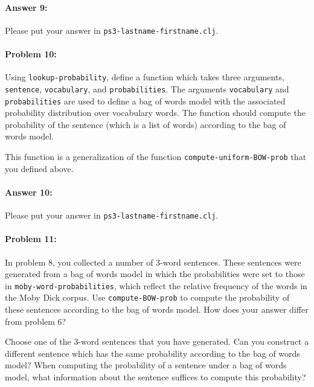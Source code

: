 \documentclass[10pt]{article}
\newcommand{\required}[1]{{\color{blue}{#1}}}
\newcommand{\PSnum}{3}
\begin{document}
\paragraph{Answer 9:} Please put your answer in
\texttt{ps\PSnum-lastname-firstname.clj}.

\hrulefill %

\paragraph{Problem 10:}

Using \texttt{lookup-probability}, define a
function \required{\texttt{compute-BOW-prob}} which takes three arguments,
\texttt{sentence}, \texttt{vocabulary}, and
\texttt{probabilities}. The arguments \texttt{vocabulary} and
\texttt{probabilities} are used to define a bag of words model with
the associated probability distribution over vocabulary words. The
function should compute the probability of the sentence (which is a
list of words) according to the bag of words model.

This function is a generalization of the function
\texttt{compute-uniform-BOW-prob} that you defined above.

\paragraph{Answer 10:} Please put your answer in
\texttt{ps\PSnum-lastname-firstname.clj}.

\hrulefill %

\paragraph{Problem 11:}

In problem 8, you collected a number of 3-word sentences. These
sentences were generated from a bag of words model in which the
probabilities were set to those in \texttt{moby-word-probabilities},
which reflect the relative frequency of the words in the Moby Dick
corpus. Use \texttt{compute-BOW-prob} to compute the probability of
these sentences according to the bag of words model. How does your
answer differ from problem 6?

Choose one of the 3-word sentences that you have generated. Can you
construct a different sentence which has the same probability
according to the bag of words model? When computing the probability of
a sentence under a bag of words model, what information about the
sentence suffices to compute this probability?
\end{document}
